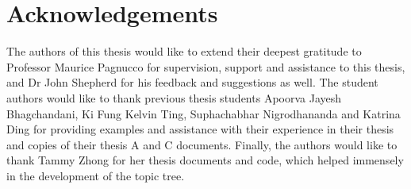 \chapter*{Acknowledgements}\label{ack}

The authors of this thesis would like to extend their deepest gratitude to Professor Maurice Pagnucco for supervision, support and assistance to this thesis, and Dr John Shepherd for his feedback and suggestions as well.
The student authors would like to thank previous thesis students Apoorva Jayesh Bhagchandani, Ki Fung Kelvin Ting, Suphachabhar Nigrodhananda and Katrina Ding for providing examples and assistance with their experience in their thesis and copies of their thesis A and C documents. Finally, the authors would like to thank Tammy Zhong for her thesis documents and code, which helped immensely in the development of the topic tree.
